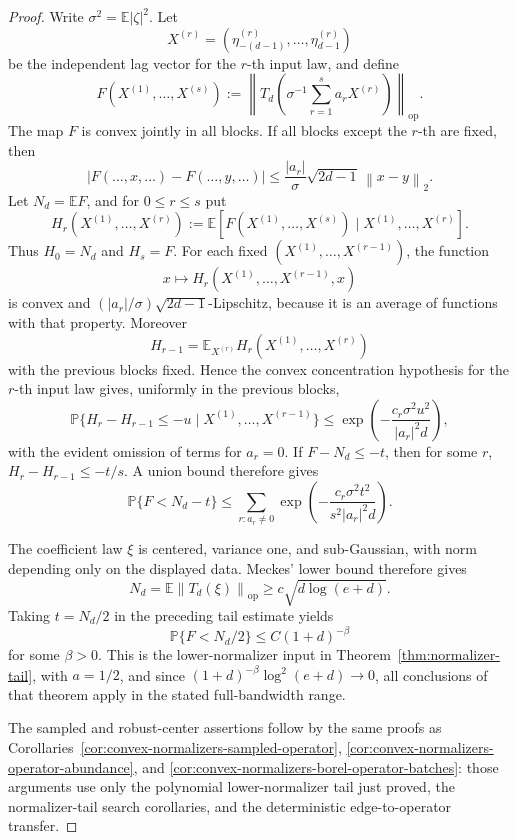 \documentclass[11pt]{amsart}
\numberwithin{equation}{section}
\theoremstyle{definition}
\theoremstyle{remark}
\newcommand{\op}{\mathrm{op}}
\newcommand{\Prob}{\mathbb P}
\newcommand{\Exp}{\mathbb E}
\newcommand{\norm}[1]{\left\lVert #1\right\rVert}
\newcommand{\abs}[1]{\left\lvert #1\right\rvert}
\begin{document}
\begin{proof}
Write \(\sigma^2=\Exp|\zeta|^2\).  Let
\[
  X^{(r)}=(\eta_{-(d-1)}^{(r)},\ldots,\eta_{d-1}^{(r)})
\]
be the independent lag vector for the \(r\)-th input law, and define
\[
  F(X^{(1)},\ldots,X^{(s)})
  :=
  \left\|T_d\left(\sigma^{-1}\sum_{r=1}^s a_rX^{(r)}\right)\right\|_{\op}.
\]
The map \(F\) is convex jointly in all blocks.  If all blocks except the
\(r\)-th are fixed, then
\[
  \abs{F(\ldots,x,\ldots)-F(\ldots,y,\ldots)}
  \le
  \frac{|a_r|}{\sigma}\sqrt{2d-1}\,\norm{x-y}_2 .
\]
Let \(N_d=\Exp F\), and for \(0\le r\le s\) put
\[
  H_r(X^{(1)},\ldots,X^{(r)})
  :=
  \Exp\!\left[F(X^{(1)},\ldots,X^{(s)})
  \mid X^{(1)},\ldots,X^{(r)}\right].
\]
Thus \(H_0=N_d\) and \(H_s=F\).  For each fixed
\((X^{(1)},\ldots,X^{(r-1)})\), the function
\[
  x\mapsto H_r(X^{(1)},\ldots,X^{(r-1)},x)
\]
is convex and \((|a_r|/\sigma)\sqrt{2d-1}\)-Lipschitz, because it is an
average of functions with that property.  Moreover
\[
  H_{r-1}
  =
  \Exp_{X^{(r)}} H_r(X^{(1)},\ldots,X^{(r)})
\]
with the previous blocks fixed.  Hence the convex concentration hypothesis for
the \(r\)-th input law gives, uniformly in the previous blocks,
\[
  \Prob\{H_r-H_{r-1}\le -u\mid X^{(1)},\ldots,X^{(r-1)}\}
  \le
  \exp\left(-\frac{c_r\sigma^2u^2}{|a_r|^2d}\right),
\]
with the evident omission of terms for \(a_r=0\).  If
\(F-N_d\le-t\), then for some \(r\),
\(H_r-H_{r-1}\le -t/s\).  A union bound therefore gives
\[
  \Prob\{F<N_d-t\}
  \le
  \sum_{r:a_r\ne0}
  \exp\left(-\frac{c_r\sigma^2t^2}{s^2|a_r|^2d}\right).
\]

The coefficient law \(\xi\) is centered, variance one, and sub-Gaussian, with
norm depending only on the displayed data.  Meckes' lower bound therefore gives
\[
  N_d=\Exp\norm{T_d(\xi)}_{\op}\ge c\sqrt{d\log(e+d)}.
\]
Taking \(t=N_d/2\) in the preceding tail estimate yields
\[
  \Prob\{F<N_d/2\}\le C(1+d)^{-\beta}
\]
for some \(\beta>0\).  This is the lower-normalizer input in
Theorem~\ref{thm:normalizer-tail}, with \(a=1/2\), and since
\((1+d)^{-\beta}\log^2(e+d)\to0\), all conclusions of that theorem apply in
the stated full-bandwidth range.

The sampled and robust-center assertions follow by the same proofs as
Corollaries~\ref{cor:convex-normalizers-sampled-operator},
\ref{cor:convex-normalizers-operator-abundance}, and
\ref{cor:convex-normalizers-borel-operator-batches}: those arguments use only
the polynomial lower-normalizer tail just proved, the normalizer-tail search
corollaries, and the deterministic edge-to-operator transfer.
\end{proof}
\end{document}
